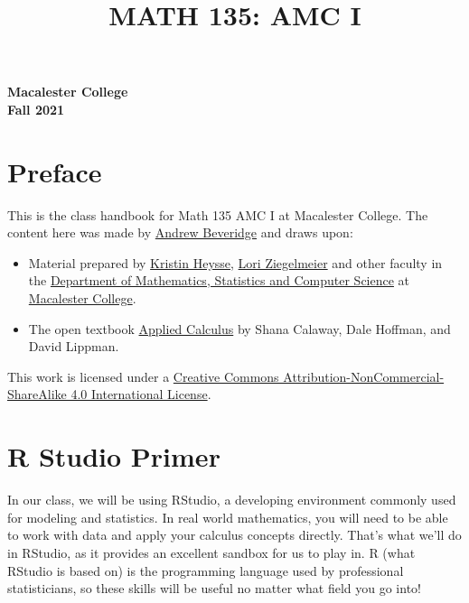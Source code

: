 \documentclass[
]{book}
\title{MATH 135: AMC I}
\author{}
\date{\vspace{-2.5em}}
\providecommand{\tightlist}{%
  \setlength{\itemsep}{0pt}\setlength{\parskip}{0pt}}
\begin{document}
\maketitle

{
\setcounter{tocdepth}{1}
\tableofcontents
}
\textbf{Macalester College}\\
\textbf{Fall 2021}

\hypertarget{preface}{%
\chapter*{Preface}\label{preface}}

This is the class handbook for Math 135 AMC I at Macalester College. The content here was made by \href{https://mathbeveridge.github.io}{Andrew Beveridge}
and draws upon:

\begin{itemize}
\tightlist
\item
  Material prepared by \href{https://www.macalester.edu/~kheysse/}{Kristin Heysse}, \href{https://www.loriziegelmeier.com/}{Lori Ziegelmeier} and other faculty in the \href{https://www.macalester.edu/mscs/}{Department of Mathematics, Statistics and Computer Science} at \href{https://www.macalester.edu/}{Macalester College}.
\item
  The open textbook \href{http://www.opentextbookstore.com/details.php?id=14}{Applied Calculus} by Shana Calaway, Dale Hoffman, and David Lippman.
\end{itemize}


This work is licensed under a \href{https://creativecommons.org/licenses/by-nc-sa/4.0/}{Creative Commons Attribution-NonCommercial-ShareAlike 4.0 International License}.

\hypertarget{r-studio-primer}{%
\chapter{R Studio Primer}\label{r-studio-primer}}

In our class, we will be using RStudio, a developing environment commonly used for modeling and statistics. In real world mathematics, you will need to be able to work with data and apply your calculus concepts directly. That's what we'll do in RStudio, as it provides an excellent sandbox for us to play in. R (what RStudio is based on) is the programming language used by professional statisticians, so these skills will be useful no matter what field you go into!
\end{document}
